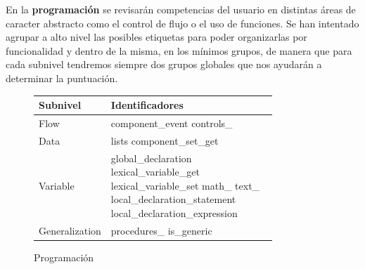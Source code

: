 \documentclass[a4paper, 12pt]{book}
\begin{document}
En la \textbf{programación} se revisarán competencias del usuario en distintas áreas de caracter abstracto como el control de flujo o el uso de funciones. Se han intentado agrupar a alto nivel las posibles etiquetas para poder organizarlas por funcionalidad y dentro de la misma, en los mínimos grupos, de manera que para cada subnivel tendremos siempre dos grupos globales que nos ayudarán a determinar la puntuación. 
\begin{figure}[H]
	\begin{center}
	    \begin{tabular}{| l | p{0.80\linewidth} | }
	    \hline
	    \textbf{Subnivel} & \textbf{Identificadores} \\ \hline
		Flow & component\_event controls\_ \\ \hline
		Data & lists component\_set\_get \\ \hline
		Variable & global\_declaration lexical\_variable\_get lexical\_variable\_set math\_ text\_ local\_declaration\_statement local\_declaration\_expression \\ \hline
		Generalization & procedures\_ is\_generic \\ \hline
            \end{tabular}
	\end{center}
	\caption{Programación}
	\label{fig:programmingScore}
\end{figure}
\end{document}
